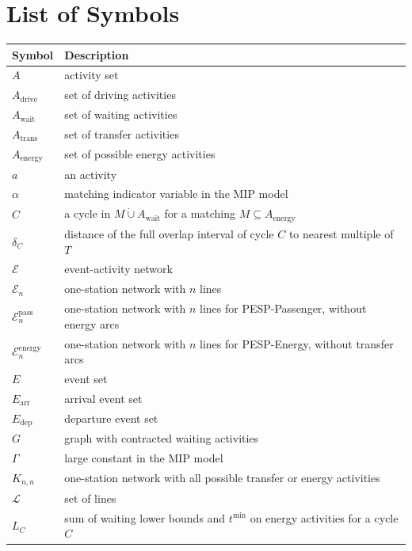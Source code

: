 \documentclass[11pt,a4paper]{article}
\newcommand{\dotcup}{\mathbin{\dot\cup}}
\newcommand{\arr}{\mathrm{arr}}
\newcommand{\dep}{\mathrm{dep}}
\newcommand{\drive}{\mathrm{drive}}
\newcommand{\wait}{\mathrm{wait}}
\newcommand{\transfer}{\mathrm{trans}}
\newcommand{\energy}{\mathrm{energy}}
\newcommand{\pesppassenger}{PESP-Passenger\xspace}
\newcommand{\pespenergy}{PESP-Energy\xspace}
\newcommand{\osn}{one-station network\xspace}
\newcommand{\cL}{\mathcal{L}}
\newcommand{\cE}{\mathcal{E}}
\theoremstyle{definition}
\theoremstyle{remark}
\begin{document}
\hypersetup{hidelinks}





\newpage
\section*{List of Symbols}

\begin{longtable}{p{.11\linewidth}p{.83\linewidth}}%
        \toprule
        Symbol & Description \\ \midrule
        $A$ & activity set \\
        $A_{\drive}$ & set of driving activities \\
        $A_{\wait}$ & set of waiting activities \\
        $A_{\transfer}$ & set of transfer activities \\
        $A_{\energy}$ & set of possible energy activities \\
        $a$ & an activity \\
        $\alpha$ & matching indicator variable in the MIP model \\
        $C$ & a cycle in $M \dotcup A_\wait$ for a matching $M \subseteq A_\energy$ \\
        $\delta_C$ & distance of the full overlap interval of cycle $C$ to nearest multiple of $T$\\
        $\cE$ & event-activity network \\
        $\cE_n$ & \osn with $n$ lines \\
        $\cE_n^{\mathrm{pass}}$ & \osn with $n$ lines for \pesppassenger, without energy arcs \\
        $\cE_n^{\energy}$ & \osn with $n$ lines for \pespenergy, without transfer arcs \\
        $E$ & event set \\
        $E_{\arr}$ & arrival event set \\
        $E_{\dep}$ & departure event set \\
        $G$ & graph with contracted waiting activities \\
        $\Gamma$ & large constant in the MIP model \\
        $K_{n,n}$ & \osn with all possible transfer or energy activities \\
        $\cL$ & set of lines \\
        $L_C$ & sum of waiting lower bounds and $t^{\min}$ on energy activities for a cycle $C$ \\

\end{longtable}
\end{document}
